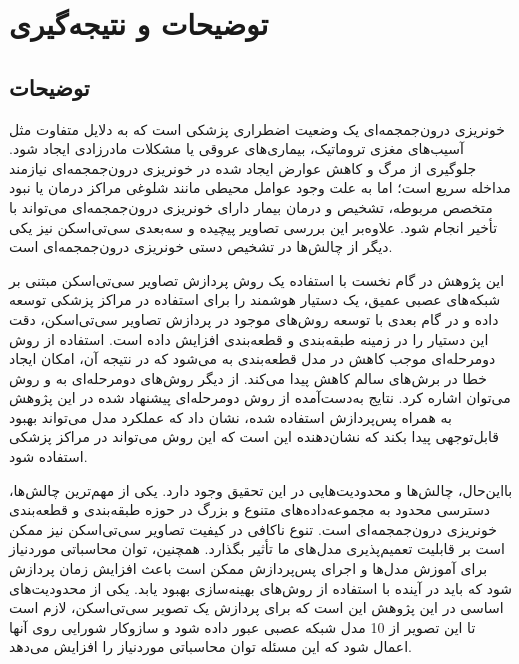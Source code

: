 \chapter{توضیحات و نتیجه‌گیری}
\section{توضیحات}
خونریزی درون‌جمجمه‌ای یک وضعیت اضطراری پزشکی است که به دلایل متفاوت مثل آسیب‌های مغزی تروماتیک، بیماری‌های عروقی یا مشکلات مادرزادی ایجاد شود\cite{monica2022detection}.
جلوگیری از مرگ و کاهش عوارض ایجاد شده در خونریزی درون‌جمجمه‌ای نیازمند مداخله سریع است؛ اما به علت وجود عوامل محیطی مانند شلوغی مراکز درمان یا نبود متخصص مربوطه، تشخیص و درمان بیمار دارای خونریزی درون‌جمجمه‌ای می‌تواند با تأخیر انجام شود. علاوه‌بر این بررسی تصاویر پیچیده و سه‌بعدی سی‌تی‌اسکن نیز یکی دیگر از چالش‌ها در تشخیص دستی خونریزی درون‌جمجمه‌ای است.

این پژوهش در گام نخست با استفاده یک روش پردازش تصاویر سی‌تی‌اسکن مبتنی بر شبکه‌های عصبی عمیق،‌ یک دستیار هوشمند را برای استفاده در مراکز پزشکی توسعه داده و در گام بعدی با توسعه روش‌های موجود در پردازش تصاویر سی‌تی‌اسکن، دقت این دستیار را در زمینه طبقه‌بندی و قطعه‌بندی افزایش داده است.
استفاده از روش دومرحله‌ای موجب کاهش
در مدل قطعه‌بندی به 
می‌شود که در نتیجه آن، امکان ایجاد خطا در برش‌‌های سالم کاهش پیدا می‌کند. از دیگر روش‌های دومرحله‌ای به 
و روش
می‌توان اشاره کرد.
 نتایج به‌دست‌آمده از روش دومرحله‌ای پیشنهاد شده در این پژوهش به همراه پس‌پردازش استفاده شده،‌ نشان داد که عملکرد مدل می‌تواند بهبود قابل‌توجهی پیدا بکند که نشان‌دهنده این است که این روش می‌تواند در مراکز پزشکی استفاده شود.

بااین‌حال، چالش‌ها و محدودیت‌هایی در این تحقیق وجود دارد. یکی از مهم‌ترین چالش‌ها، دسترسی محدود به مجموعه‌داده‌های متنوع و بزرگ در حوزه طبقه‌بندی و قطعه‌بندی خونریزی درون‌جمجمه‌ای است. تنوع ناکافی در کیفیت تصاویر سی‌تی‌اسکن نیز ممکن است بر قابلیت تعمیم‌پذیری مدل‌های ما تأثیر بگذارد. همچنین، توان محاسباتی موردنیاز برای آموزش مدل‌ها و اجرای پس‌پردازش ممکن است باعث افزایش زمان پردازش شود که باید در آینده با استفاده از روش‌های بهینه‌سازی بهبود یابد.
یکی از محدودیت‌های اساسی در این پژوهش این است که برای پردازش یک تصویر سی‌تی‌اسکن،‌ لازم است تا این تصویر از 10 مدل شبکه عصبی عبور داده شود و سازوکار شورایی روی آنها اعمال شود که این مسئله توان محاسباتی موردنیاز را افزایش می‌دهد.

